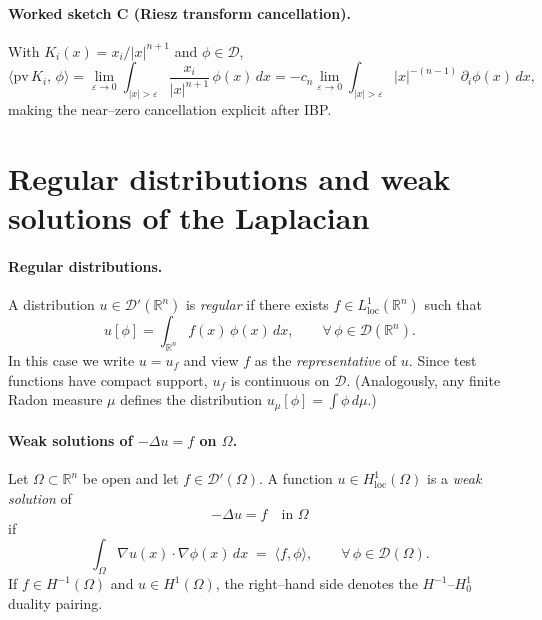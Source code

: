 \documentclass[12pt,a4paper]{article}
\theoremstyle{plain}
\theoremstyle{definition}
\theoremstyle{remark}
\theoremstyle{remark}
\begin{document}
\smallskip

\paragraph{Worked sketch C (Riesz transform cancellation).}
With $K_i(x)=x_i/|x|^{n+1}$ and $\phi\in\mathcal D$,
\[
\Big\langle \mathrm{pv}\,K_i,\,\phi\Big\rangle
= \lim_{\varepsilon\to0}\int_{|x|>\varepsilon} \frac{x_i}{|x|^{n+1}}\,\phi(x)\,dx
= -c_n \lim_{\varepsilon\to0}\int_{|x|>\varepsilon} |x|^{-(n-1)}\,\partial_i\phi(x)\,dx,
\]
making the near--zero cancellation explicit after IBP.

\section*{Regular distributions and weak solutions of the Laplacian}

\paragraph{Regular distributions.}

\smallskip

A distribution $u\in\mathcal D'(\mathbb R^n)$ is \emph{regular} if there exists
$f\in L^1_{\mathrm{loc}}(\mathbb R^n)$ such that
\[
u[\phi]=\int_{\mathbb R^n} f(x)\,\phi(x)\,dx,
\qquad \forall\,\phi\in\mathcal D(\mathbb R^n).
\]
In this case we write $u=u_f$ and view $f$ as the \emph{representative} of $u$.
Since test functions have compact support, $u_f$ is continuous on $\mathcal D$.
(Analogously, any finite Radon measure $\mu$ defines the distribution
$u_\mu[\phi]=\int \phi\,d\mu$.)

\bigskip

\paragraph{Weak solutions of $-\Delta u=f$ on $\Omega$.}

\smallskip

Let $\Omega\subset\mathbb R^n$ be open and let $f\in\mathcal D'(\Omega)$.
A function $u\in H^1_{\mathrm{loc}}(\Omega)$ is a \emph{weak solution} of
\[
-\Delta u=f \quad\text{in }\Omega
\]
if
\[
\int_{\Omega} \nabla u(x)\cdot \nabla \phi(x)\,dx
\;=\; \langle f,\phi\rangle,
\qquad \forall\,\phi\in\mathcal D(\Omega).
\]
If $f\in H^{-1}(\Omega)$ and $u\in H^1(\Omega)$, the right--hand side denotes the
$H^{-1}$--$H_0^1$ duality pairing.

\smallskip
\end{document}
